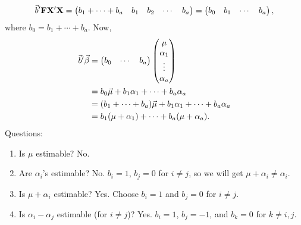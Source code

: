 \[ \vec{b}'\mathbf{F}\mathbf{X}'\mathbf{X} =\begin{pmatrix}
        b_1 + \cdots + b_a & b_1 & b_2 & \cdots & b_a
    \end{pmatrix}=\begin{pmatrix}
        b_0 & b_1 & \cdots & b_a
    \end{pmatrix}, \]
where $ b_0=b_1+\cdots+b_a $. Now,
\begin{align*}
    \vec{b}'\vec{\beta}
     & =\begin{pmatrix}
            b_0 & \cdots & b_a
        \end{pmatrix}
    \begin{pmatrix}
        \mu      \\
        \alpha_1 \\
        \vdots   \\
        \alpha_a
    \end{pmatrix}                                                  \\
     & =b_0 \vec{\mu}+b_1 \alpha_1+\cdots+b_a \alpha_a           \\
     & =(b_1+\cdots+b_a)\vec{\mu}+b_1\alpha_1+\cdots+b_a\alpha_a \\
     & =b_1(\mu+\alpha_1)+\cdots+b_a(\mu+\alpha_a).
\end{align*}
Questions:
\begin{enumerate}[(1)]
    \item Is $ \mu $ estimable? No.
    \item Are $ \alpha_i $'s estimable? No. $ b_i=1 $, $ b_j=0 $ for $ i\ne j $,
          so we will get $ \mu+\alpha_i\ne \alpha_i $.
    \item Is $ \mu+\alpha_i $ estimable? Yes. Choose $ b_i=1 $ and $ b_j=0 $ for $ i\ne j $.
    \item Is $ \alpha_i-\alpha_j $ estimable (for $ i\ne j $)? Yes. $ b_i=1 $, $ b_j=-1 $, and
          $ b_k=0 $ for $ k\ne i,j $.
\end{enumerate}
